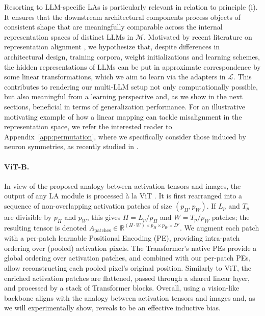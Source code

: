 Resorting to LLM-specific LAs is particularly relevant in relation to
principle (i). It ensures that the downstream architectural components
process objects of consistent shape that are meaningfully comparable
across the internal representation spaces of distinct LLMs in
$\mathcal{M}$. Motivated by recent literature on representation
alignment \citep{huh2024,morcos2018,moschella2022,kornblith2019}, we
hypothesize that, despite differences in architectural design, training
corpora, weight initializations and learning schemes, the hidden
representations of LLMs can be put in approximate correspondence by
some linear transformations, which we aim to learn via the adapters in
$\mathcal{L}$. This contributes to rendering our multi-LLM setup not
only computationally possible, but also meaningful from a learning
perspective and, as we show in the next sections, beneficial in terms
of generalization performance. For an illustrative motivating example
of how a linear mapping can tackle misalignment in the representation
space, we refer the interested reader to Appendix~\ref{app:permutation},
where we specifically consider those induced by neuron symmetries, as
recently studied in \citep{navon2023,samuelkainsworth2022}.

\paragraph{ViT-B.} In view of the proposed analogy between activation
tensors and images, the output of any LA module is processed
\`a la ViT \citep{dosovitskiy2020}. It is first rearranged into a
sequence of non-overlapping activation patches of size $(p_H, p_W)$. If
$L_p$ and $T_p$ are divisible by $p_H$ and $p_W$, this gives
$H = L_p/p_H$ and $W = T_p/p_W$ patches; the resulting tensor is denoted
$A_{\text{patches}} \in \mathbb{R}^{(H \cdot W) \times p_H \times p_W \times D'}$.
We augment each patch with a per-patch learnable Positional Encoding
(PE), providing intra-patch ordering over (pooled) activation pixels.
The Transformer's native PEs provide a global ordering over activation
patches, and combined with our per-patch PEs, allow reconstructing each
pooled pixel's original position. Similarly to ViT, the enriched
activation patches are flattened, passed through a shared linear layer,
and processed by a stack of Transformer blocks. Overall, using a
vision-like backbone aligns with the analogy between activation tensors
and images and, as we will experimentally show, reveals to be an
effective inductive bias.

